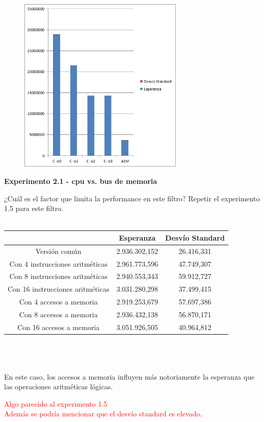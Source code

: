 \begin{figure}
  \begin{center}
	\includegraphics[width=0.7\textwidth]{imagenes/21.jpg}
  \end{center}
\end{figure}
\newpage

\vspace*{0.3cm} \noindent
\textbf{Experimento 2.1 - cpu vs. bus de memoria}

¿Cuál es el factor que limita la performance en este filtro?
Repetir el experimento 1.5 para este filtro. \\
\\
 \begin{tabular}[c]{|c|c|c|}
	\hline
		 & Esperanza & Desv\'io Standard\\
		\hline
Versi\'on com\'un & 2.936.302,152 & 26.416,331 \\
\hline
Con 4 instrucciones aritméticas & 2.961.773,596 & 47.749,307 \\
\hline
Con 8 instrucciones aritméticas & 2.940.553,343 & 59.912,727 \\
\hline
Con 16 instrucciones aritméticas & 3.031.280,298 & 37.499,415 \\
\hline
Con 4 accesos a memoria & 2.919.253,679 & 57.697,386 \\
\hline
Con 8 accesos a memoria & 2.936.432,138 & 56.870,171 \\
\hline
Con 16 accesos a memoria & 3.051.926,505 & 40.964,812 \\
\hline
	\end{tabular}\\\\
\\
En este caso, los accesos a memoria influyen m\'as notoriamente la esperanza que las operaciones aritm\'eticas l\'ogicas.
\newpage
\begin{figure}
  \begin{center}
  \end{center}
\end{figure}
\textcolor{red}{Algo parecido al experimento 1.5 \\
Adem\'as se podr\'ia mencionar que el desv\'io standard es elevado.}

